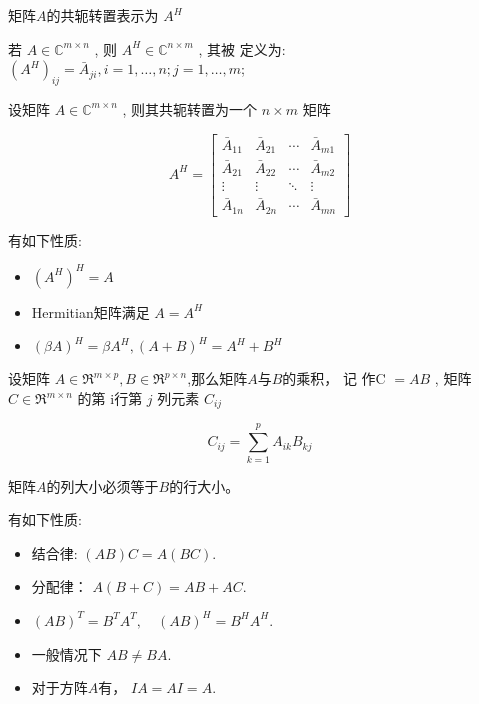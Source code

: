 \begin{definition}[共轭转置]
    矩阵$A$的共轭转置表示为 $ A^{{H}} $
    
    若 $ {A} \in \mathbb{C}^{m \times n} $ , 则 $ A^{H} \in \mathbb{C}^{n \times m} $ , 其被 定义为: $ \left(A^{H}\right)_{i j}=\bar{A}_{j i}, i=1, \ldots, n ; j=1, \ldots, m $;

    设矩阵 $ A \in \mathbb{C}^{m \times n} $ , 则其共轭转置为一个 $ n \times m $ 矩阵

\begin{equation}
A^{H}=\left[\begin{array}{cccc}
\bar{A}_{11} & \bar{A}_{21} & \cdots & \bar{A}_{m 1} \\
\bar{A}_{21} & \bar{A}_{22} & \cdots & \bar{A}_{m 2} \\
\vdots & \vdots & \ddots & \vdots \\
\bar{A}_{1 n} & \bar{A}_{2 n} & \cdots & \bar{A}_{m n}
\end{array}\right]
\end{equation}
\end{definition}

\begin{corollary}[共轭转置的性质]
    有如下性质:
    \begin{itemize}
        \item $ \left(A^{H}\right)^{H}=A $
        \item Hermitian矩阵满足 $ A=A^{H} $
        \item $ (\beta A)^{H}=\beta A^{H},(A+B)^{H}=A^{H}+B^{H} $
    \end{itemize}
\end{corollary}


\begin{definition}[矩阵乘法]
    设矩阵 $ A \in \mathfrak{R}^{m \times p}, B \in \mathfrak{R}^{p \times n} $,那么矩阵$A$与$B$的乘积， 记 作C $ =A B $ ,  矩阵 $ C \in \mathfrak{R}^{m \times n} $ 的第 i行第 $ j $ 列元素 $ C_{i j} $

    \begin{equation}
{C}_{i j}=\sum_{k=1}^{p} A_{i k} B_{k j}
\end{equation}

\end{definition}

\begin{remark}
    矩阵$A$的列大小必须等于$B$的行大小。
\end{remark} 

\begin{corollary}[矩阵乘法性质]
    有如下性质:
    \begin{itemize}
        \item 结合律: $ (A B) C=A(B C) $.
        \item 分配律： $ A(B+C)=A B+A C $.
        \item $ (A B)^{T}=B^{T} A^{T}, \quad(A B)^{{H}}=B^{H} A^{H} $.
        \item 一般情况下 $ A B \neq B A $.
        \item 对于方阵$A$有， $ I A=A I=A $.
    \end{itemize} 
\end{corollary}

